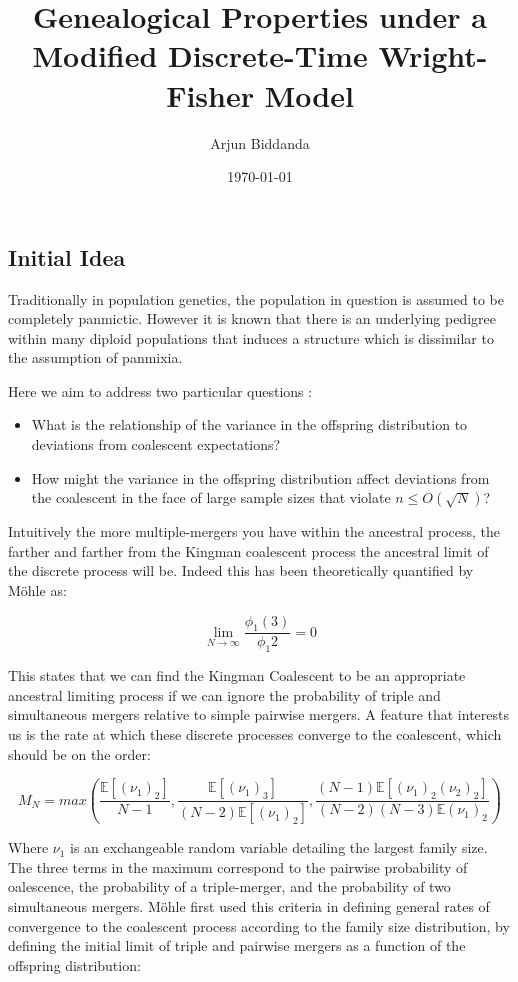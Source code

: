 \documentclass[11pt]{article}
\title{Genealogical Properties under a Modified Discrete-Time Wright-Fisher Model}
\author{Arjun Biddanda}
\date{\today}
\begin{document}
\maketitle
\linenumbers

\subsection{Initial Idea}

Traditionally in population genetics, the population in question is assumed to be completely panmictic. However it is known that there is an underlying pedigree within many diploid populations that induces a structure which is dissimilar to the assumption of panmixia.

Here we aim to address two particular questions : 

\begin{itemize}
	\item What is the relationship of the variance in the offspring distribution to deviations from coalescent expectations?
	\item How might the variance in the offspring distribution affect deviations from the coalescent in the face of large sample sizes that violate $n \leq O(\sqrt{N})$?
\end{itemize}

Intuitively the more multiple-mergers you have within the ancestral process, the farther and farther from the Kingman coalescent process the ancestral limit of the discrete process will be. Indeed this has been theoretically quantified by M\"{o}hle \cite{Mohle2000} as:

$$\lim_{N \rightarrow \infty} \frac{\phi_1(3)}{\phi_1{2}} = 0$$

This states that we can find the Kingman Coalescent to be an appropriate ancestral limiting process if we can ignore the probability of triple and simultaneous mergers relative to simple pairwise mergers. A feature that interests us is the rate at which these discrete processes converge to the coalescent, which should be on the order:

$$M_N = max\left( \frac{\mathbb{E}[(\nu_1)_2]}{N-1} , \frac{\mathbb{E}[(\nu_1)_3]}{(N-2)\mathbb{E}[(\nu_1)_2]}, \frac{(N-1)\mathbb{E}[(\nu_1)_2(\nu_2)_2]}{(N-2)(N-3)\mathbb{E}(\nu_1)_2} \right)$$

Where $\nu_1$ is an exchangeable random variable detailing the largest family size. The three terms in the maximum correspond to the pairwise probability of oalescence, the probability of a triple-merger, and the probability of two simultaneous mergers. M\"{o}hle \cite{Mohle2000} first used this criteria in defining general rates of convergence to the coalescent process according to the family size distribution, by defining the initial limit of triple and pairwise mergers as a function of the offspring distribution: 
\end{document}
